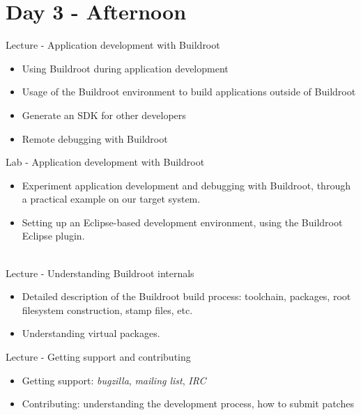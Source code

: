 \documentclass[a4paper,12pt,obeyspaces,spaces,hyphens]{article}
\begin{document}
\section{Day 3 - Afternoon}

\feagendatwocolumn
{Lecture - Application development with Buildroot}
{
  \begin{itemize}
  \item Using Buildroot during application development
  \item Usage of the Buildroot environment to build applications
    outside of Buildroot
  \item Generate an SDK for other developers
  \item Remote debugging with Buildroot
  \end{itemize}
}
{Lab - Application development with Buildroot}
{
  \begin{itemize}
  \item Experiment application development and debugging with
    Buildroot, through a practical example on our target system.
  \item Setting up an Eclipse-based development environment, using the
    Buildroot Eclipse plugin.
  \end{itemize}
}
\\
\feagendatwocolumn
{Lecture - Understanding Buildroot internals}
{
  \begin{itemize}
  \item Detailed description of the Buildroot build process:
    toolchain, packages, root filesystem construction, stamp files,
    etc.
  \item Understanding virtual packages.
  \end{itemize}
}
{Lecture - Getting support and contributing}
{
  \begin{itemize}
  \item Getting support: {\em bugzilla}, {\em mailing list}, {\em IRC}
  \item Contributing: understanding the development process, how to
    submit patches
  \end{itemize}
}
\end{document}
